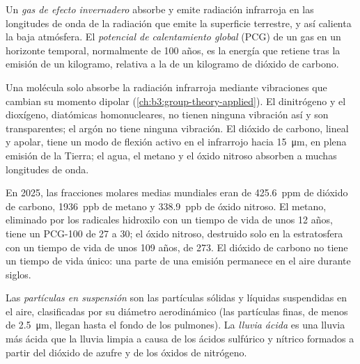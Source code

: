 \begin{definition}\label{def:b3:environmental-toxicology:greenhouse}
Un \emph{gas de efecto invernadero} absorbe y emite radiación
infrarroja en las longitudes de onda de la radiación que emite la superficie terrestre, y
así calienta la baja atmósfera. El \emph{potencial de calentamiento
global} (PCG) de un gas en un horizonte temporal,
normalmente de 100 años, es la energía que retiene tras la emisión de un kilogramo,
relativa a la de un kilogramo de dióxido de carbono.
\end{definition}

Una molécula solo absorbe la radiación infrarroja mediante vibraciones que cambian su
momento dipolar (\cref{ch:b3:group-theory-applied}). El dinitrógeno y el dioxígeno,
diatómicas homonucleares, no tienen ninguna vibración así y son transparentes; el argón no tiene
ninguna vibración. El dióxido de carbono, lineal y apolar, tiene un modo de flexión activo en el
infrarrojo hacia \qty{15}{\micro\metre}, en plena emisión de la Tierra; el agua, el metano
y el óxido nitroso absorben a muchas longitudes de onda.

En 2025, las fracciones molares medias mundiales eran de \qty{425.6}{ppm} de dióxido de carbono, \qty{1936}{ppb} de
metano y \qty{338.9}{ppb} de óxido nitroso. El metano, eliminado por los radicales hidroxilo con un
tiempo de vida de unos 12 años, tiene un PCG-100 de 27 a 30; el óxido nitroso, destruido solo en
la estratosfera con un tiempo de vida de unos 109 años, de 273. El dióxido de carbono no tiene un
tiempo de vida único: una parte de una emisión permanece en el aire durante siglos.

\begin{definition}\label{def:b3:environmental-toxicology:pollutants}
Las \emph{partículas en suspensión} son las partículas sólidas y líquidas
suspendidas en el aire, clasificadas por su diámetro aerodinámico (las partículas finas,
de menos de \qty{2.5}{\micro\metre}, llegan hasta el fondo de los pulmones). La \emph{lluvia
ácida} es una lluvia más ácida que la lluvia limpia a causa de los ácidos sulfúrico y
nítrico formados a partir del dióxido de azufre y de los óxidos de nitrógeno.
\end{definition}

